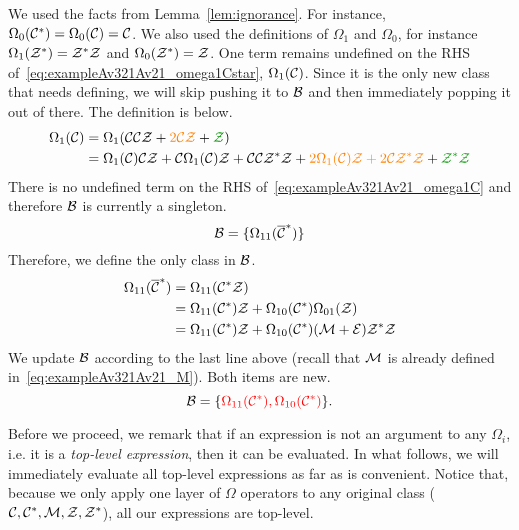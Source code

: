 \documentclass[12pt, a4paper, twoside]{report}
\begin{document}
We used the facts from Lemma~\ref{lem:ignorance}. For instance, $\Omega_0(\mathcal{C}^*) = \Omega_0(\mathcal{C}) = \mathcal{C}$. We also used the definitions of $\Omega_1$ and $\Omega_0$, for instance $\Omega_1(\mathcal{Z}^*) = \mathcal{Z}^*\mathcal{Z}$ and $\Omega_0(\mathcal{Z}^*) = \mathcal{Z}$. One term remains undefined on the RHS of~\eqref{eq:exampleAv321Av21_omega1Cstar}, $\Omega_1(\mathcal{C})$. Since it is the only new class that needs defining, we will skip pushing it to $\mathcal{B}$ and then immediately popping it out of there. The definition is below.
\begin{align}
  \begin{aligned}
    \Omega_1(\C) &= \Omega_1(\C\C\Z + \textcolor{orange}{2\C\Z} + \textcolor{green}{\Z})\\
    &= \Omega_1(\C)\C\Z + \C\Omega_1(\C)\Z + \C\C\Z^*\Z + \textcolor{orange}{2\Omega_1(\C)\Z + 2\C\Z^*\Z} + \textcolor{green}{\Z^*\Z}
  \end{aligned}
  \label{eq:exampleAv321Av21_omega1C}
\end{align}
There is no undefined term on the RHS of~\eqref{eq:exampleAv321Av21_omega1C} and therefore $\mathcal{B}$ is currently a singleton.
$$\mathcal{B} = \{\Omega_{11}(\overline{\mathcal{C}}^*)\}$$
Therefore, we define the only class in $\mathcal{B}$.
\begin{align}
  \begin{aligned}
  \Omega_{11}(\overline{\mathcal{C}}^*) &= \Omega_{11}(\mathcal{C}^*\mathcal{Z})\\
                         &= \Omega_{11}(\mathcal{C}^*)\mathcal{Z} + \Omega_{10}(\mathcal{C}^*)\Omega_{01}(\mathcal{Z})\\
                         &= \Omega_{11}(\mathcal{C}^*)\mathcal{Z} + \Omega_{10}(\mathcal{C}^*)(\mathcal{M}+\mathcal{E})\mathcal{Z}^*\mathcal{Z}\\
                       \end{aligned}
  \label{eq:omega11barCstar}
\end{align}
We update $\mathcal{B}$ according to the last line above (recall that $\mathcal{M}$ is already defined in~\eqref{eq:exampleAv321Av21_M}). Both items are new.
$$\mathcal{B} = \{\textcolor{red}{\Omega_{11}(\mathcal{C}^*), \Omega_{10}(\mathcal{C}^*)}\}.$$

Before we proceed, we remark that if an expression is not an argument to any $\Omega_i$, i.e. it is a \emph{top-level expression}, then it can be evaluated. In what follows, we will immediately evaluate all top-level expressions as far as is convenient. Notice that, because we only apply one layer of $\Omega$ operators to any original class ($\mathcal{C},\mathcal{C}^*,\mathcal{M},\mathcal{Z},\mathcal{Z}^*$), all our expressions are top-level.
\end{document}
